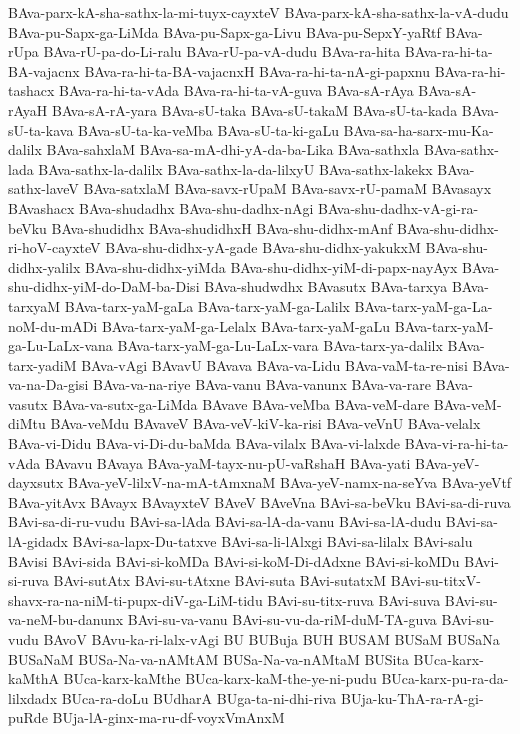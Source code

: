 {BAva-parx-kA-sha-sathx-la-mi-tuyx-cayxteV
BAva-parx-kA-sha-sathx-la-vA-dudu
BAva-pu-Sapx-ga-LiMda
BAva-pu-Sapx-ga-Livu
BAva-pu-SepxY-yaRtf
BAva-rUpa
BAva-rU-pa-do-Li-ralu
BAva-rU-pa-vA-dudu
BAva-ra-hita
BAva-ra-hi-ta-BA-vajacnx
BAva-ra-hi-ta-BA-vajacnxH
BAva-ra-hi-ta-nA-gi-papxnu
BAva-ra-hi-tashacx
BAva-ra-hi-ta-vAda
BAva-ra-hi-ta-vA-guva
BAva-sA-rAya
BAva-sA-rAyaH
BAva-sA-rA-yara
BAva-sU-taka
BAva-sU-takaM
BAva-sU-ta-kada
BAva-sU-ta-kava
BAva-sU-ta-ka-veMba
BAva-sU-ta-ki-gaLu
BAva-sa-ha-sarx-mu-Ka-dalilx
BAva-sahxlaM
BAva-sa-mA-dhi-yA-da-ba-Lika
BAva-sathxla
BAva-sathx-lada
BAva-sathx-la-dalilx
BAva-sathx-la-da-lilxyU
BAva-sathx-lakekx
BAva-sathx-laveV
BAva-satxlaM
BAva-savx-rUpaM
BAva-savx-rU-pamaM
BAvasayx
BAvashacx
BAva-shudadhx
BAva-shu-dadhx-nAgi
BAva-shu-dadhx-vA-gi-ra-beVku
BAva-shudidhx
BAva-shudidhxH
BAva-shu-didhx-mAnf
BAva-shu-didhx-ri-hoV-cayxteV
BAva-shu-didhx-yA-gade
BAva-shu-didhx-yakukxM
BAva-shu-didhx-yalilx
BAva-shu-didhx-yiMda
BAva-shu-didhx-yiM-di-papx-nayAyx
BAva-shu-didhx-yiM-do-DaM-ba-Disi
BAva-shudwdhx
BAvasutx
BAva-tarxya
BAva-tarxyaM
BAva-tarx-yaM-gaLa
BAva-tarx-yaM-ga-Lalilx
BAva-tarx-yaM-ga-La-noM-du-mADi
BAva-tarx-yaM-ga-Lelalx
BAva-tarx-yaM-gaLu
BAva-tarx-yaM-ga-Lu-LaLx-vana
BAva-tarx-yaM-ga-Lu-LaLx-vara
BAva-tarx-ya-dalilx
BAva-tarx-yadiM
BAva-vAgi
BAvavU
BAvava
BAva-va-Lidu
BAva-vaM-ta-re-nisi
BAva-va-na-Da-gisi
BAva-va-na-riye
BAva-vanu
BAva-vanunx
BAva-va-rare
BAva-vasutx
BAva-va-sutx-ga-LiMda
BAvave
BAva-veMba
BAva-veM-dare
BAva-veM-diMtu
BAva-veMdu
BAvaveV
BAva-veV-kiV-ka-risi
BAva-veVnU
BAva-velalx
BAva-vi-Didu
BAva-vi-Di-du-baMda
BAva-vilalx
BAva-vi-lalxde
BAva-vi-ra-hi-ta-vAda
BAvavu
BAvaya
BAva-yaM-tayx-nu-pU-vaRshaH
BAva-yati
BAva-yeV-dayxsutx
BAva-yeV-lilxV-na-mA-tAmxnaM
BAva-yeV-namx-na-seYva
BAva-yeVtf
BAva-yitAvx
BAvayx
BAvayxteV
BAveV
BAveVna
BAvi-sa-beVku
BAvi-sa-di-ruva
BAvi-sa-di-ru-vudu
BAvi-sa-lAda
BAvi-sa-lA-da-vanu
BAvi-sa-lA-dudu
BAvi-sa-lA-gidadx
BAvi-sa-lapx-Du-tatxve
BAvi-sa-li-lAlxgi
BAvi-sa-lilalx
BAvi-salu
BAvisi
BAvi-sida
BAvi-si-koMDa
BAvi-si-koM-Di-dAdxne
BAvi-si-koMDu
BAvi-si-ruva
BAvi-sutAtx
BAvi-su-tAtxne
BAvi-suta
BAvi-sutatxM
BAvi-su-titxV-shavx-ra-na-niM-ti-pupx-diV-ga-LiM-tidu
BAvi-su-titx-ruva
BAvi-suva
BAvi-su-va-neM-bu-danunx
BAvi-su-va-vanu
BAvi-su-vu-da-riM-duM-TA-guva
BAvi-su-vudu
BAvoV
BAvu-ka-ri-lalx-vAgi
BU
BUBuja
BUH
BUSAM
BUSaM
BUSaNa
BUSaNaM
BUSa-Na-va-nAMtAM
BUSa-Na-va-nAMtaM
BUSita
BUca-karx-kaMthA
BUca-karx-kaMthe
BUca-karx-kaM-the-ye-ni-pudu
BUca-karx-pu-ra-da-lilxdadx
BUca-ra-doLu
BUdharA
BUga-ta-ni-dhi-riva
BUja-ku-ThA-ra-rA-gi-puRde
BUja-lA-ginx-ma-ru-df-voyxVmAnxM
}
